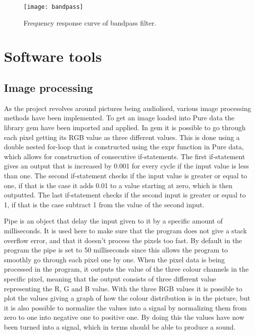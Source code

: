 \begin{figure}
\centering
\texttt{[image: bandpass]}
\caption{Frequency response curve of bandpass filter.}
\label{fig:bandpass}
\end{figure}

\section{Software tools}\label{sec:softwareTools}
	\subsection{Image processing}\label{sub:imageprocessing}
	As the project revolves around pictures being audiolised, various image processing methods have been implemented. To get an image loaded into Pure data the library gem have been imported and applied. In gem it is possible to go through each pixel getting its RGB value as three different values. This is done using a double nested for-loop that is constructed using the expr function in Pure data, which allows for construction of consecutive if-statements. The first if-statement gives an output that is increased by 0.001 for every cycle if the input value is less than one. The second if-statement checks if the input value is greater or equal to one, if that is the case it adds 0.01 to a value starting at zero, which is then outputted. The last if-statement checks if the second input is greater or equal to 1, if that is the case subtract 1 from the value of the second input.
	
	Pipe is an object that delay the input given to it by a specific amount of milliseconds. It is used here to make sure that the program does not give a stack overflow error, and that it doesn't process the pixels too fast. By default in the program the pipe is set to 50 milliseconds since this allows the program to smoothly go through each pixel one by one. 
	When the pixel data is being processed in the program, it outputs the value of the three colour channels in the specific pixel, meaning that the output consists of three different value representing the R, G and B value. With the three RGB values it is possible to plot the values giving a graph of how the colour distribution is in the picture, but it is also possible to normalize the values into a signal by normalizing them from zero to one into negative one to positive one. By doing this the values have now been turned into a signal, which in terms should be able to produce a sound.


